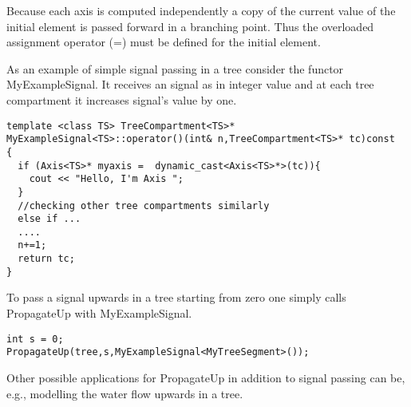 Because  each  axis is computed   independently a copy of  the current
value  of  the initial  element   is  passed forward   in a  branching
point. Thus the overloaded assignment operator (=) must be defined for
the initial element.

As an example of simple signal passing in a  tree consider the functor
MyExampleSignal. It receives an signal as in integer value and at each
tree compartment it increases signal's value by one.

\begin{verbatim}
template <class TS> TreeCompartment<TS>* 
MyExampleSignal<TS>::operator()(int& n,TreeCompartment<TS>* tc)const
{
  if (Axis<TS>* myaxis =  dynamic_cast<Axis<TS>*>(tc)){
    cout << "Hello, I'm Axis ";
  }
  //checking other tree compartments similarly
  else if ...  
  ....
  n+=1;
  return tc; 
}
\end{verbatim}

To pass a signal upwards in a tree starting from zero one simply calls
PropagateUp with MyExampleSignal.

\begin{verbatim}
int s = 0;
PropagateUp(tree,s,MyExampleSignal<MyTreeSegment>());
\end{verbatim}

Other possible  applications for  PropagateUp   in addition to  signal
passing can be, e.g., modelling the water flow upwards in a tree.


